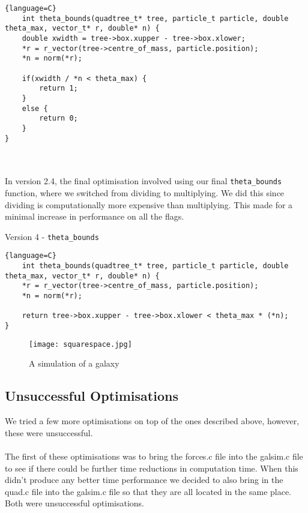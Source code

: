 \documentclass{article}
\begin{document}
\begin{lstlisting}{language=C}
    int theta_bounds(quadtree_t* tree, particle_t particle, double theta_max, vector_t* r, double* n) {
    double xwidth = tree->box.xupper - tree->box.xlower;
    *r = r_vector(tree->centre_of_mass, particle.position);
    *n = norm(*r);

    if(xwidth / *n < theta_max) {
        return 1;
    }
    else {
        return 0;
    }
}
\end{lstlisting}
\\\\
In version 2.4, the final optimisation involved using our final \verb|theta_bounds| function, where we switched from dividing to multiplying. We did this since dividing is computationally more expensive than multiplying. This made for a minimal increase in performance on all the flags.
\begin{center}
    Version 4 - \verb|theta_bounds|
\end{center}
\begin{lstlisting}{language=C}
    int theta_bounds(quadtree_t* tree, particle_t particle, double theta_max, vector_t* r, double* n) {
    *r = r_vector(tree->centre_of_mass, particle.position);
    *n = norm(*r);

    return tree->box.xupper - tree->box.xlower < theta_max * (*n);
}
\end{lstlisting}
\begin{figure}[htb]
\begin{center}
\texttt{[image: squarespace.jpg]}
\caption{A simulation of a galaxy}
\end{center}
\end{figure}
\newpage
\subsection{Unsuccessful Optimisations}
We tried a few more optimisations on top of the ones described above, however, these were unsuccessful.
\\\\
The first of these optimisations was to bring the forces.c file into the galsim.c file to see if there could be further time reductions in computation time. When this didn't produce any better time performance we decided to also bring in the quad.c file into the galsim.c file so that they are all located in the same place. Both were unsuccessful optimisations.
\newpage
\end{document}
